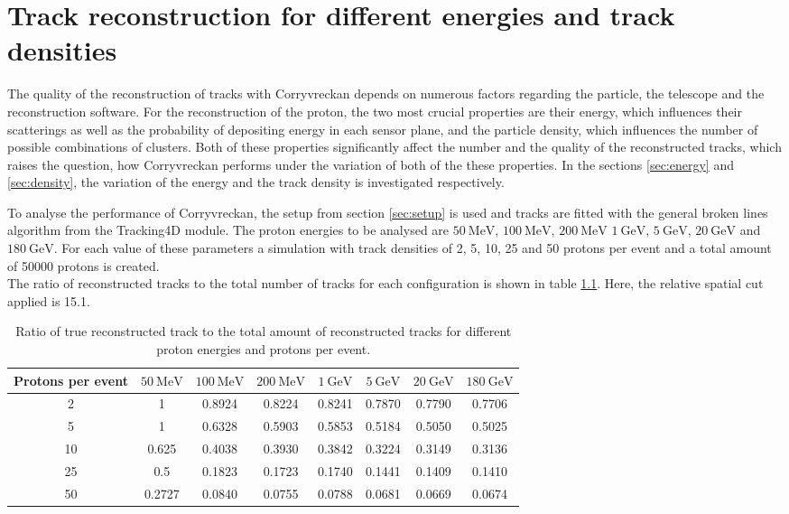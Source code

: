\chapter{Track reconstruction for different energies and track densities}
The quality of the reconstruction of tracks with Corryvreckan depends on numerous factors regarding the particle, the telescope and the reconstruction software.
For the reconstruction of the proton, the two most crucial properties are their energy, which influences their scatterings as well as the probability of
depositing energy in each sensor plane, and the particle density, which influences the number of possible combinations of clusters.
Both of these properties significantly affect the number and the quality of the reconstructed tracks, which raises the question, how Corryvreckan performs
under the variation of both of the these properties.
In the sections \ref{sec:energy} and \ref{sec:density}, the variation of the energy and the track density is investigated respectively.

To analyse the performance of Corryvreckan, the setup from section \ref{sec:setup} is used and tracks are fitted with the general broken lines algorithm from the Tracking4D module.
The proton energies to be analysed are $\SI{50}{\mega\eV}$, $\SI{100}{\mega\eV}$, $\SI{200}{\mega\eV}$
$\SI{1}{\giga\eV}$, $\SI{5}{\giga\eV}$, $\SI{20}{\giga\eV}$ and $\SI{180}{\giga\eV}$. For each value of these parameters a simulation with track densities
of 2, 5, 10, 25 and 50 protons per event and a total amount of 50000 protons is created. \\
The ratio of reconstructed tracks to the total number of tracks for each configuration is shown in table \ref{tab:study}. Here, the relative spatial cut applied is 15.1.


\begin{table}
  \centering
  \begin{tabular}{c | c c c c c c c}
    \toprule
     Protons per event &  $\SI{50}{\mega\eV}$ & $\SI{100}{\mega\eV}$ & $\SI{200}{\mega\eV}$ & $\SI{1}{\giga\eV}$ & $\SI{5}{\giga\eV}$ & $\SI{20}{\giga\eV}$ & $\SI{180}{\giga\eV}$ \\
    \midrule
     2   & 1 & 0.8924 & 0.8224 & 0.8241 & 0.7870 & 0.7790 & 0.7706  \\
     5   & 1 & 0.6328 & 0.5903 & 0.5853 & 0.5184 & 0.5050 & 0.5025  \\
     10  & 0.625 & 0.4038 & 0.3930 & 0.3842 & 0.3224 & 0.3149 & 0.3136  \\
     25  & 0.5 & 0.1823 & 0.1723 & 0.1740 & 0.1441 & 0.1409 & 0.1410  \\
     50  & 0.2727 & 0.0840 & 0.0755 & 0.0788 & 0.0681 & 0.0669 & 0.0674  \\
  \end{tabular}
  \caption{Ratio of true reconstructed track to the total amount of reconstructed tracks for different proton energies and protons per event.}
  \label{tab:study}
\end{table}

